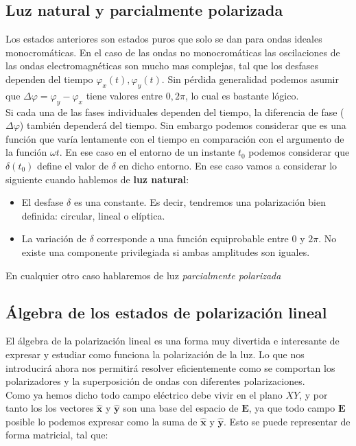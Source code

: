 \documentclass[12pt]{article}
\newcommand{\En}{\mathbf{E}}
\newcommand{\hnx}{\hat{\mathbf{x}}}
\newcommand{\hny}{\hat{\mathbf{y}}}
\numberwithin{equation}{section}
\numberwithin{figure}{section}
\begin{document}
\subsection{Luz natural y parcialmente polarizada}

Los estados anteriores son estados puros que solo se dan para ondas ideales monocromáticas. En el caso de las ondas no monocromáticas las oscilaciones de las ondas electromagnéticas son mucho mas complejas, tal que los desfases dependen del tiempo $\varphi_x(t), \varphi_y (t)$. Sin pérdida generalidad podemos asumir que $\Delta \varphi = \varphi_y - \varphi_x$ tiene valores entre $0,2\pi$, lo cual es bastante lógico. \\

Si cada una de las fases individuales dependen del tiempo, la diferencia de fase ($\Delta \varphi$) también dependerá del tiempo. Sin embargo podemos considerar que es una función que varía lentamente con el tiempo en comparación con el argumento de la función $\omega t$. En ese caso en el entorno de un instante $t_0$ podemos considerar que $\delta(t_0)$ define el valor de $\delta$ en dicho entorno. En ese caso vamos a considerar lo siguiente cuando hablemos de \textbf{luz natural}:

\begin{itemize}
\item El desfase $\delta$ es una constante. Es decir, tendremos una polarización bien definida: circular, lineal o elíptica.
\item La variación de $\delta$ corresponde a una función equiprobable entre $0$ y $2 \pi$. No existe una componente privilegiada si ambas amplitudes son iguales.
\end{itemize}
En cualquier otro caso hablaremos de luz \textit{parcialmente polarizada}

\subsection{Álgebra de los estados de polarización lineal}

El álgebra de la polarización lineal es una forma muy divertida e interesante de expresar y estudiar como funciona la polarización de la luz. Lo que nos introducirá ahora nos permitirá resolver eficientemente como se comportan los polarizadores y la superposición de ondas con diferentes polarizaciones. \\

Como ya hemos dicho todo campo eléctrico debe vivir en el plano $XY$, y por tanto los  los vectores $\hnx$ y $\hny$ son una base del espacio de $\En$, ya que todo campo $\En$ posible lo podemos expresar como la suma de $\hnx$ y $\hny$. Esto se puede representar de forma matricial, tal que:
\end{document}
